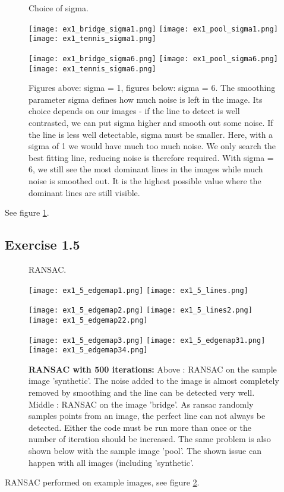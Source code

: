 \documentclass[a4paper,8pt]{extarticle}
\begin{document}
\begin{figure}
  \caption{Choice of sigma.}
  \centering
    \texttt{[image: ex1\_bridge\_sigma1.png]}
    \texttt{[image: ex1\_pool\_sigma1.png]}
    \texttt{[image: ex1\_tennis\_sigma1.png]}
    
    \texttt{[image: ex1\_bridge\_sigma6.png]}
    \texttt{[image: ex1\_pool\_sigma6.png]}
    \texttt{[image: ex1\_tennis\_sigma6.png]}

  \label{fig:sigma}
  \caption{Figures above: sigma = 1, figures below: sigma = 6. The smoothing parameter sigma defines how much noise is left in the image. Its choice depends on our images - if the line to detect is well contrasted, we can put sigma higher and smooth out some noise. If the line is less well detectable, sigma must be smaller. Here, with a sigma of 1 we would have much too much noise. We only search the best fitting line, reducing noise is therefore required. With sigma = 6, we still see the most dominant lines in the images while much noise is smoothed out. It is the highest possible value where the dominant lines are still visible.}
\end{figure}
See figure \ref{fig:sigma}.


\subsection{Exercise 1.5}

\begin{figure}
  \caption{RANSAC.}
  \centering
    \texttt{[image: ex1\_5\_edgemap1.png]}
    \texttt{[image: ex1\_5\_lines.png]}
    
    \texttt{[image: ex1\_5\_edgemap2.png]}   
    \texttt{[image: ex1\_5\_lines2.png]}
    \texttt{[image: ex1\_5\_edgemap22.png]}

    \texttt{[image: ex1\_5\_edgemap3.png]}   
    \texttt{[image: ex1\_5\_edgemap31.png]}
    \texttt{[image: ex1\_5\_edgemap34.png]}
    
  \label{fig:ransac}
  \caption{\textbf{RANSAC with 500 iterations:} Above : RANSAC on the sample image 'synthetic'. The noise added to the image is almost completely removed by smoothing and the line can be detected very well. Middle : RANSAC on the image 'bridge'. As ransac randomly samples points from an image, the perfect line can not always be detected. Either the code must be run more than once or the number of iteration should be increased. The same problem is also shown below with the sample image 'pool'. The shown issue can happen with all images (including 'synthetic'.}
\end{figure}
RANSAC performed on example images, see figure \ref{fig:ransac}.
\end{document}
